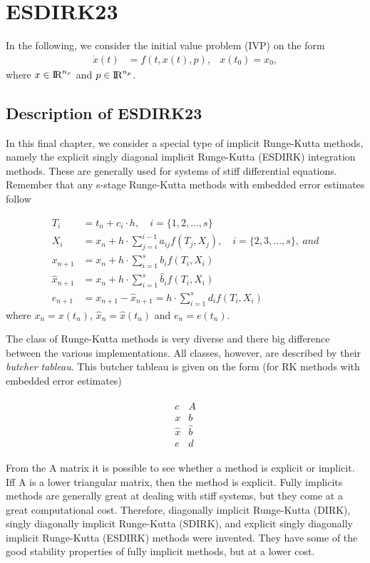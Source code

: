 \chapter{ESDIRK23}
In the following, we consider the initial value problem (IVP) on the form
\begin{align}
    \dot{x}(t) &= f(t,x(t),p), & x(t_0) = x_0,
\end{align}
where $x \in \text{I\kern-0.15em R} ^{n_x}$ and $p \in \text{I\kern-0.15em R} ^{n_p}$. 

\section{Description of ESDIRK23}
In this final chapter, we consider a special type of implicit Runge-Kutta methods, namely the explicit singly diagonal implicit Runge-Kutta (ESDIRK) integration methods. These are generally used for systems of stiff differential equations. Remember that any s-stage Runge-Kutta methods with embedded error estimates follow 

\begin{align}
    T_i &= t_n+c_i \cdot h, \quad i = \{1,2,...,s\}\\
    X_i &= x_n + h \cdot \sum_{j=i}^{i-1} a_{ij} f(T_j, X_j), \quad i = \{2,3,...,s\}, \ and \\
    x_{n+1} &= x_n + h \cdot \sum_{i=1}^s b_i f(T_i,X_i) \\
    \hat x_{n+1} &= x_n + h \cdot \sum_{i=1}^s \hat b_i f(T_i,X_i) \\
    e_{n+1} &= x_{n+1} - \hat x_{n+1} = h \cdot \sum_{i=1}^s d_i f(T_i,X_i)
\end{align}
where $x_{n} = x(t_n)$, $\hat{x}_n = \hat x(t_n)$ and $e_n = e(t_n)$. 

The class of Runge-Kutta methods is very diverse and there big difference between the various implementations. All classes, however, are described by their \textit{butcher tableau}. This butcher tableau is given on the form (for RK methods with embedded error estimates)

\begin{align}
    \begin{array}{c|c}
        c & A  \\ \hline
        x & b  \\
        \hat{x} & \hat{b} \\ \hline
        e & d
    \end{array}
\end{align}

From the A matrix it is possible to see whether a method is explicit or implicit. Iff A is a lower triangular matrix, then the method is explicit. Fully implicits methods are generally great at dealing with stiff systems, but they come at a great computational cost. Therefore, diagonally implicit Runge-Kutta (DIRK), singly diagonally implicit Runge-Kutta (SDIRK), and explicit singly diagonally implicit Runge-Kutta (ESDIRK) methods were invented. They have some of the good stability properties of fully implicit methods, but at a lower cost. 

